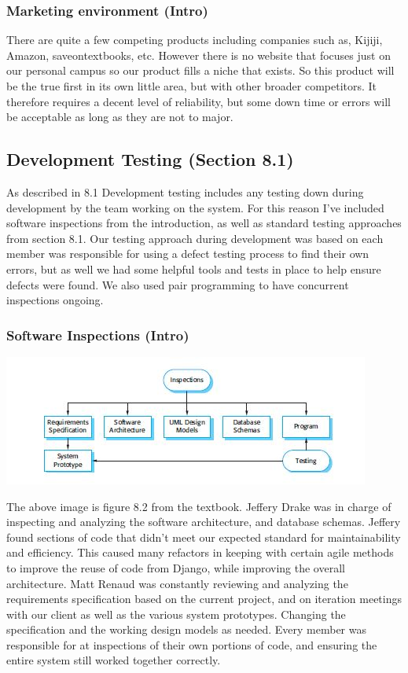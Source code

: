 \documentclass[11pt]{article}
\begin{document}
		\subsubsection{Marketing environment (Intro)}
			There are quite a few competing products including companies such as, Kijiji, Amazon, saveontextbooks, etc.
			However there is no website that focuses just on our personal campus so our product fills a niche that exists.
			So this product will be the true first in its own little area, but with other broader competitors.
			It therefore requires a decent level of reliability, but some down time or errors will be acceptable as long as they are not to major.

	\subsection{Development Testing (Section 8.1)}
		As described in 8.1 Development testing includes any testing down during development by the team working on the system. 
		For this reason I've included software inspections from the introduction, as well as standard testing approaches from section 8.1.
		Our testing approach during development was based on each member was responsible for using a defect testing process to find their own errors, but as well we had some helpful tools and tests in place to help ensure defects were found. 
		We also used pair programming to have concurrent inspections ongoing.

		\subsubsection{Software Inspections (Intro)}
			\centerline{\includegraphics[scale=0.75]{./images/inspections}} 
			The above image is figure 8.2 from the textbook. Jeffery Drake was in charge of inspecting and analyzing the software architecture, and database schemas. 
			Jeffery found sections of code that didn't meet our expected standard for maintainability and efficiency. 
			This caused many refactors in keeping with certain agile methods to improve the reuse of code from Django, while improving the overall architecture.  
			Matt Renaud was constantly reviewing and analyzing the requirements specification based on the current project, and on iteration meetings with our client as well as the various system prototypes. 
			Changing the specification and the working design models as needed. 
			Every member was responsible for at inspections of their own portions of code, and ensuring the entire system still worked together correctly.
\end{document}
